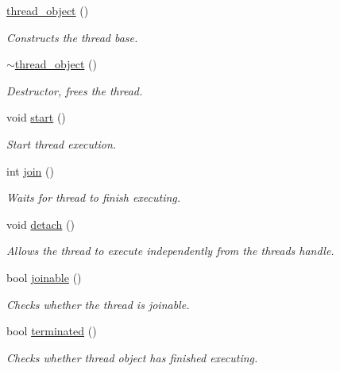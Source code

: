 \begin{DoxyCompactItemize}
\item 
\mbox{\label{classcpen333_1_1thread_1_1thread__object_a1e15fda903a0e1bbc0c06fc7d870d0d9}} 
\hyperlink{classcpen333_1_1thread_1_1thread__object_a1e15fda903a0e1bbc0c06fc7d870d0d9}{thread\+\_\+object} ()
\begin{DoxyCompactList}\small\item\em Constructs the thread base. \end{DoxyCompactList}\item 
\mbox{\label{classcpen333_1_1thread_1_1thread__object_addcca372aa82c04d454ade7fd60d1e75}} 
\hyperlink{classcpen333_1_1thread_1_1thread__object_addcca372aa82c04d454ade7fd60d1e75}{$\sim$thread\+\_\+object} ()
\begin{DoxyCompactList}\small\item\em Destructor, frees the thread. \end{DoxyCompactList}\item 
void \hyperlink{classcpen333_1_1thread_1_1thread__object_ae4484909a3f4418c0c0db318d615bde1}{start} ()
\begin{DoxyCompactList}\small\item\em Start thread execution. \end{DoxyCompactList}\item 
int \hyperlink{classcpen333_1_1thread_1_1thread__object_ac7334918eabfcf855cec00ed2a68a039}{join} ()
\begin{DoxyCompactList}\small\item\em Waits for thread to finish executing. \end{DoxyCompactList}\item 
\mbox{\label{classcpen333_1_1thread_1_1thread__object_a6e6fd163c5f5f72dcd6385a74ad316b6}} 
void \hyperlink{classcpen333_1_1thread_1_1thread__object_a6e6fd163c5f5f72dcd6385a74ad316b6}{detach} ()
\begin{DoxyCompactList}\small\item\em Allows the thread to execute independently from the thread\textquotesingle{}s handle. \end{DoxyCompactList}\item 
bool \hyperlink{classcpen333_1_1thread_1_1thread__object_a374e31ea56accc37a3468012a411da5d}{joinable} ()
\begin{DoxyCompactList}\small\item\em Checks whether the thread is joinable. \end{DoxyCompactList}\item 
bool \hyperlink{classcpen333_1_1thread_1_1thread__object_a3f7f0eb9632797cbd86dc4b84f38baed}{terminated} ()
\begin{DoxyCompactList}\small\item\em Checks whether thread object has finished executing. \end{DoxyCompactList}\end{DoxyCompactItemize}
